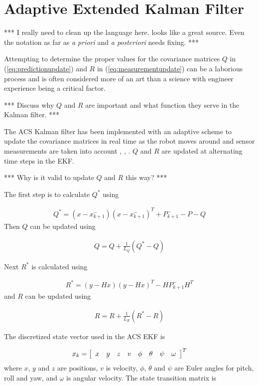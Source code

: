 \section{Adaptive Extended Kalman Filter}
\label{sec:adaptiveekf}
*** I really need to clean up the language here. \cite{Busse03adaptiveEKF} looks like a great source. Even the notation as far as \textit{a priori} and \textit{a posteriori} needs fixing. ***

Attempting to determine the proper values for the covariance matrices $Q$ in (\ref{eq:predictionupdate}) and $R$ in (\ref{eq:measurementupdate}) can be a laborious process and is often considered more of an art than a science with engineer experience being a critical factor.

*** Discuss why $Q$ and $R$ are important and what function they serve in the Kalman filter. ***

The ACS Kalman filter has been implemented with an adaptive scheme to update the covariance matrices in real time as the robot moves around and sensor measurements are taken into account \cite{Sights06}, \cite{Mehra72}, \cite{Busse03adaptiveEKF}. $Q$ and $R$ are updated at alternating time steps in the EKF.

*** Why is it valid to update $Q$ and $R$ this way? ***

The first step is to calculate $Q^\ast$ using

\begin{align}
\label{eq:qstar}
Q^\ast = \left(x-x_{k+1}^-\right)\left(x-x_{k+1}^-\right)^T + P_{k+1}^- - P - Q
\end{align}
Then $Q$ can be updated using

\begin{align}
\label{eq:q}
Q = Q + \frac{1}{L_Q}\left(Q^\ast-Q\right)
\end{align}

Next $R^\ast$ is calculated using

\begin{align}
\label{eq:rstar}
R^\ast = \left(y-Hx\right)\left(y-Hx\right)^T - HP_{k+1}^-H^T
\end{align}
and $R$ can be updated using

\begin{align}
\label{eq:r}
R = R + \frac{1}{L_R}\left(R^\ast-R\right)
\end{align}

The discretized state vector used in the ACS EKF is

\begin{align*}
x_k = \left[\begin{array}{c c c c c c c c} x & y & z & v & \phi & \theta & \psi & \omega \end{array}\right]^T
\end{align*}
where $x$, $y$ and $z$ are positions, $v$ is velocity, $\phi$, $\theta$ and $\psi$ are Euler angles for pitch, roll and yaw, and $\omega$ is angular velocity. The state transition matrix is

